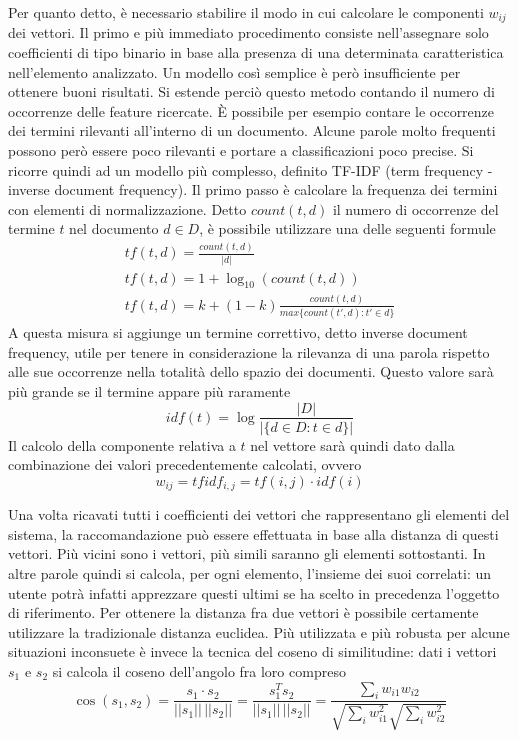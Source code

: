 \documentclass[Lau,binding=0.6cm,noexaminfo,oneside]{sapthesis}
\begin{document}
Per quanto detto, è necessario stabilire il modo in cui calcolare le componenti $w_{ij}$ dei vettori. Il primo e più immediato procedimento consiste nell'assegnare solo coefficienti di tipo binario in base alla presenza di una determinata caratteristica nell'elemento analizzato. Un modello così semplice è però insufficiente per ottenere buoni risultati. Si estende perciò questo metodo contando il numero di occorrenze delle feature ricercate.
\MakeUppercase{è} possibile per esempio contare le occorrenze dei termini rilevanti all'interno di un documento. Alcune parole molto frequenti possono però essere poco rilevanti e portare a classificazioni poco precise. Si ricorre quindi ad un modello più complesso, definito TF-IDF (term frequency - inverse document frequency). Il primo passo è calcolare la frequenza dei termini con elementi di normalizzazione. Detto $count(t,d)$ il numero di occorrenze del termine $t$ nel documento $d \in D$, è possibile utilizzare una delle seguenti formule
\begin{gather*}
  t\!f(t,d) = \frac{count(t,d)}{|d|} \\
  t\!f(t,d) = 1 + \log_{10}(count(t,d)) \\
  t\!f(t,d) = k + (1-k) \frac{count(t,d)}{max\{count(t',d) : t' \in d\}}
\end{gather*}
A questa misura si aggiunge un termine correttivo, detto inverse document frequency, utile per tenere in considerazione la rilevanza di una parola rispetto alle sue occorrenze nella totalità dello spazio dei documenti. Questo valore sarà più grande se il termine appare più raramente
\[
idf(t) = \log \frac{|D|}{|\{d \in D : t \in d\}|}
\]
Il calcolo della componente relativa a $t$ nel vettore sarà quindi dato dalla combinazione dei valori precedentemente calcolati, ovvero
\[
w_{ij} = t\!fidf_{i,j} = t\!f(i,j) \cdot idf(i)
\]

\medskip

Una volta ricavati tutti i coefficienti dei vettori che rappresentano gli elementi del sistema, la raccomandazione può essere effettuata in base alla distanza di questi vettori. Più vicini sono i vettori, più simili saranno gli elementi sottostanti. In altre parole quindi si calcola, per ogni elemento, l'insieme dei suoi correlati: un utente potrà infatti apprezzare questi ultimi se ha scelto in precedenza l'oggetto di riferimento. Per ottenere la distanza fra due vettori è possibile certamente utilizzare la tradizionale distanza euclidea. Più utilizzata e più robusta per alcune situazioni inconsuete è invece la tecnica del coseno di similitudine: dati i vettori $s_1$ e $s_2$ si calcola il coseno dell'angolo fra loro compreso
\[
\cos(s_1, s_2) = \frac{s_1 \cdot s_2}{||s_1|| \, ||s_2||} = \frac{s_1^T s_2}{||s_1|| \, ||s_2||} = \frac{\sum_{i} w_{i1} w_{i2}}{\sqrt{\sum_{i} w_{i1}^2} \sqrt{\sum_{i} w_{i2}^2}}
\]
\end{document}
